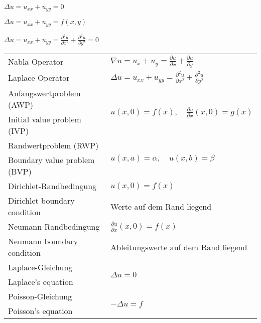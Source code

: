 \documentclass[
	final,
	a4paper,
	oneside,
	parskip=full,
	headings=standardclasses,
	headings=big,
	pointednumbers,
    fleqn
]{scrartcl}
\newcommand{\f}[2]{\frac{#1}{#2}}
\newcommand{\kl}[1]{{\left( #1 \right)}}
\begin{document}
    

    $ \Delta u=u_{xx}+u_{yy}=0 $

    $\Delta u=u_{xx}+u_{yy}=f(x,y)$

    $ \Delta u =  u_{xx} + u_{yy} = \frac{\partial^2 u}{\partial x^2} + \frac{\partial^2 u}{\partial y^2} = 0 $

    \begin{tabular}{ll}
        Nabla Operator                  & $\nabla{u} = u_{x}+u_{y} = \frac{\partial u}{\partial x} + \frac{\partial u}{\partial y}$ \\
        Laplace Operator                & $\Delta{u} = u_{xx} + u_{yy} = \frac{\partial^2 u}{\partial x^2} + \frac{\partial^2 u}{\partial y^2} $\\
        \hline
        \hline
        Anfangswertproblem (AWP)        & \multirow{2}{*}{$u\kl{x,0} = f\kl{x}, \quad {\textstyle\f{\partial u}{\partial x}}\kl{x,0} = g\kl{x}$} \\
        Initial value problem (IVP)     & \\
        \hline
        Randwertproblem (RWP)           & \multirow{2}{*}{$u\kl{x,a} = \alpha, \quad u\kl{x,b} = \beta $} \\
        Boundary value problem (BVP)    & \\
        \hline
        Dirichlet-Randbedingung         & $u\kl{x,0} = f\kl{x}$ \\
        Dirichlet boundary condition    & Werte auf dem Rand liegend \\
        \hline
        Neumann-Randbedingung           & ${\textstyle\f{\partial u}{\partial x}}\kl{x,0} = f\kl{x}$ \\
        Neumann boundary condition      & Ableitungswerte auf dem Rand liegend \\
        \hline
        Laplace-Gleichung               & \multirow{2}{*}{$\Delta u = 0 $}\\
        Laplace's equation              & \\
        \hline
        Poisson-Gleichung               & \multirow{2}{*}{$-\Delta u = f $}\\
        Poisson's equation              &
    \end{tabular}
\end{document}

